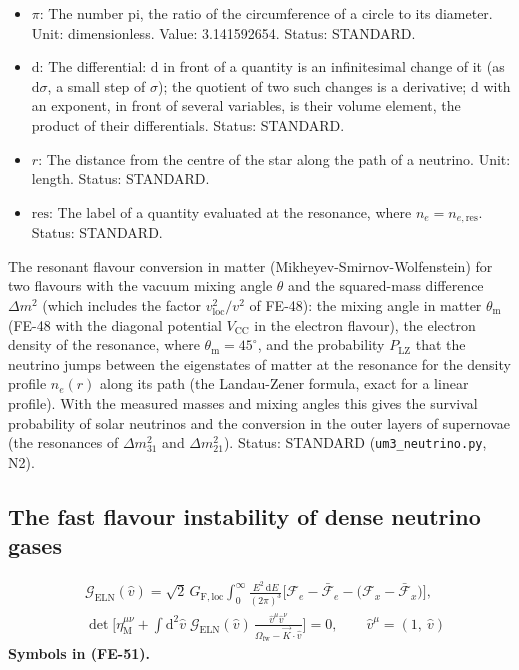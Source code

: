 \documentclass[
  10pt,
]{article}
\begin{document}
\begin{itemize}
  eigenstates of matter at the resonance (Landau-Zener);
  \(P_{\mathrm{LZ}} = 0\) is an adiabatic resonance. Unit:
  dimensionless. Status: STANDARD.
\item
  \(\pi\): The number pi, the ratio of the circumference of a circle to
  its diameter. Unit: dimensionless. Value: 3.141592654. Status:
  STANDARD.
\item
  \(\mathrm{d}\): The differential: \(\mathrm{d}\) in front of a
  quantity is an infinitesimal change of it (as \(\mathrm{d}\sigma\), a
  small step of \(\sigma\)); the quotient of two such changes is a
  derivative; \(\mathrm{d}\) with an exponent, in front of several
  variables, is their volume element, the product of their
  differentials. Status: STANDARD.
\item
  \(r\): The distance from the centre of the star along the path of a
  neutrino. Unit: length. Status: STANDARD.
\item
  \(\mathrm{res}\): The label of a quantity evaluated at the resonance,
  where \(n_e = n_{e,\mathrm{res}}\). Status: STANDARD.
\end{itemize}

The resonant flavour conversion in matter (Mikheyev-Smirnov-Wolfenstein)
for two flavours with the vacuum mixing angle \(\theta\) and the
squared-mass difference \(\Delta m^2\) (which includes the factor
\(v_{\mathrm{loc}}^2/v^2\) of FE-48): the mixing angle in matter
\(\theta_{\mathrm{m}}\) (FE-48 with the diagonal potential
\(V_{\mathrm{CC}}\) in the electron flavour), the electron density of
the resonance, where \(\theta_{\mathrm{m}} = 45^\circ\), and the
probability \(P_{\mathrm{LZ}}\) that the neutrino jumps between the
eigenstates of matter at the resonance for the density profile
\(n_e(r)\) along its path (the Landau-Zener formula, exact for a linear
profile). With the measured masses and mixing angles this gives the
survival probability of solar neutrinos and the conversion in the outer
layers of supernovae (the resonances of \(\Delta m^2_{31}\) and
\(\Delta m^2_{21}\)). Status: STANDARD (\texttt{um3\_neutrino.py}, N2).

\hypertarget{the-fast-flavour-instability-of-dense-neutrino-gases}{%
\subsection{The fast flavour instability of dense neutrino
gases}\label{the-fast-flavour-instability-of-dense-neutrino-gases}}

\[
\begin{aligned}
&\mathcal{G}_{\mathrm{ELN}}(\hat v) = \sqrt2\,G_{\mathrm{F,loc}}\int_0^\infty\frac{E^2\,\mathrm{d}E}{(2\pi)^3}\Big[\mathcal{F}_{e} - \bar{\mathcal{F}}_{e}
 - \big(\mathcal{F}_{x} - \bar{\mathcal{F}}_{x}\big)\Big],\\
&\det\Big[\eta_{\mathrm{M}}^{\mu\nu} + \int\mathrm{d}^2\hat v\;\mathcal{G}_{\mathrm{ELN}}(\hat v)\,
 \frac{\hat v^\mu\hat v^\nu}{\Omega_{\mathrm{fw}} - \vec K\cdot\hat v}\Big] = 0,\qquad \hat v^\mu = (1,\ \hat v)
\end{aligned} \tag{FE-51}
\] \textbf{Symbols in (FE-51).}
\end{document}
